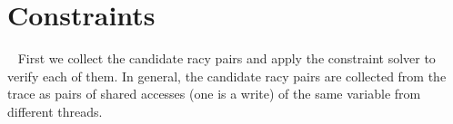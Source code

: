 %
% 
%
%  
%  
%
%
%
%
%
%


\section{Constraints}~\label{sec:constraints}
First we collect the candidate racy pairs and apply the constraint solver to verify each of them. 
In general, the candidate racy pairs are collected from the trace as  pairs of shared accesses (one is a write) of the same variable from different threads. 


